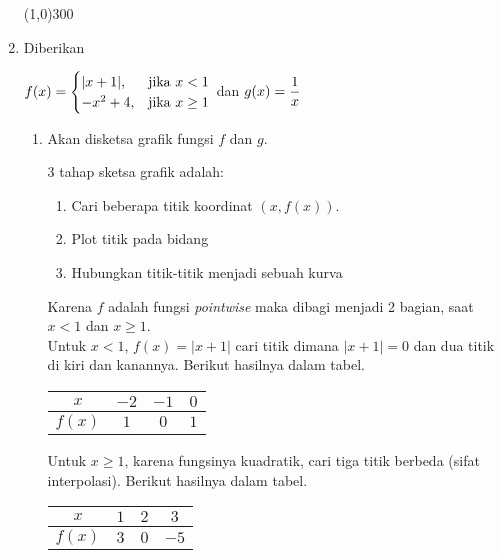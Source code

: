 \begin{enumerate}[leftmargin=*, label={\arabic*}.]
\begin{enumerate}[label={\alph*}.]
    \end{enumerate}

\begin{center}\line(1,0){300}\end{center}


\item Diberikan
\begin{center}
$\displaystyle f(x) = 
\begin{cases}
    \lvert x+1\rvert, &\text{jika $x < 1$}\\
    -x^{2}+4, &\text{jika $x \geq 1$}
\end{cases}$ dan $\displaystyle g(x) = \frac{1}{x}$
\end{center}
    \begin{enumerate}[label={\alph*}.]
    \item Akan disketsa grafik fungsi $f$ dan $g$.
    
    3 tahap sketsa grafik adalah:
        \begin{enumerate}[label={\arabic*})]
        \item Cari beberapa titik koordinat $(x,f(x))$.
        \item Plot titik pada bidang
        \item Hubungkan titik-titik menjadi sebuah kurva
        \end{enumerate}
    Karena $f$ adalah fungsi \textit{pointwise} maka dibagi menjadi 2 bagian, saat
    $x < 1$ dan $x \geq 1$.\\
    Untuk $x < 1$, $f(x) = |x+1|$ cari titik dimana $|x+1|=0$ dan dua titik di kiri 
    dan kanannya. Berikut hasilnya dalam tabel.
    \begin{center}
    \begin{tabular}{|c|c|c|c|}\hline
        $x$ & $-2$ & $-1$ & $0$ \\ \hline
        $f(x)$ & $1$ & $0$ & $1$ \\ \hline
    \end{tabular}
    \end{center}
    Untuk $x \geq 1$, karena fungsinya kuadratik, cari tiga titik berbeda (sifat interpolasi).
    Berikut hasilnya dalam tabel.
    \begin{center}
    \begin{tabular}{|c|c|c|c|}\hline
        $x$ & $1$ & $2$ & $3$ \\ \hline
        $f(x)$ & $3$ & $0$ & $-5$ \\ \hline
    \end{tabular}
    \end{center}


\end{enumerate}
\end{enumerate}
